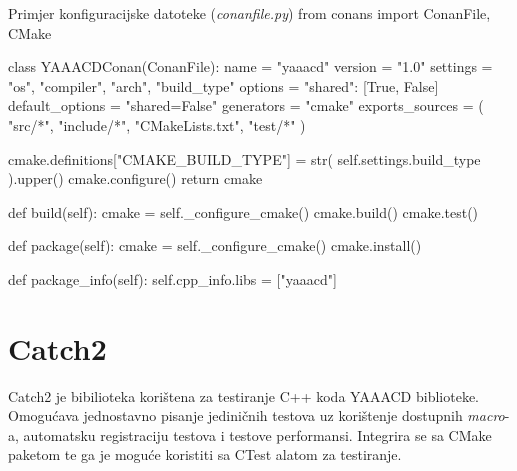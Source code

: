 \begin{pythonSource}{Primjer konfiguracijske datoteke (\textit{conanfile.py})}
from conans import ConanFile, CMake


class YAAACDConan(ConanFile):
    name = "yaaacd"
    version = "1.0"
    settings = "os", "compiler", "arch", "build_type"
    options = {"shared": [True, False]}
    default_options = "shared=False"
    generators = "cmake"
    exports_sources = (
        "src/*",
        "include/*",
        "CMakeLists.txt",
        "test/*"
    )

        cmake.definitions["CMAKE_BUILD_TYPE"] = str(
            self.settings.build_type
        ).upper()
        cmake.configure()
        return cmake

    def build(self):
        cmake = self._configure_cmake()
        cmake.build()
        cmake.test()

    def package(self):
        cmake = self._configure_cmake()
        cmake.install()

    def package_info(self):
        self.cpp_info.libs = ["yaaacd"]
\end{pythonSource}

\pagebreak

\section{Catch2}

Catch2 je bibilioteka korištena za testiranje C++ koda YAAACD biblioteke.
Omogućava jednostavno pisanje jediničnih testova uz korištenje dostupnih
\textit{macro}-a, automatsku registraciju testova i testove performansi.
Integrira se sa CMake paketom te ga je moguće koristiti sa CTest alatom
za testiranje.

